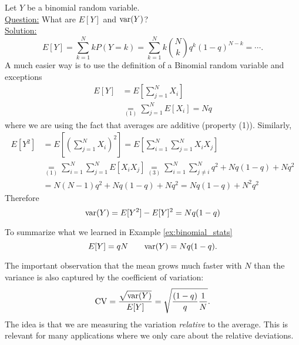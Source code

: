\begin{example}\label{ex:binomial_stats}
Let $Y$ be a binomial random variable. \\
 
 \noindent
\underline{Question:} What are $E[Y]$ and ${\rm var}(Y)$?\\
 
 
  \noindent
\underline{Solution:} 
\begin{equation*}
E[Y] = \sum_{k=1}^N k P(Y=k) =\sum_{k=1}^N k  {N \choose k}q^{k}(1-q)^{N-k} = \cdots. 
\end{equation*}
A much easier way is to use the definition of a Binomial random variable and exceptions 
\begin{align*}
E[Y] &= E\left[\sum_{j=1}^NX_i\right]\\
& \underset{(1)}{=}  \sum_{j=1}^NE\left[X_i\right]  =Nq
\end{align*}
where we are using the fact that averages are additive (property (1)). Similarly, 
\begin{align*}
E[Y^2] &= E\left[\left(\sum_{j=1}^NX_i\right)^2\right] = E\left[\sum_{i=1}^N\sum_{j=1}^NX_iX_j\right] \\
&\underset{(1)}{=}  \sum_{i=1}^N\sum_{j=1}^NE[X_iX_j]\underset{(3)}{=} \sum_{i=1}^N\sum_{j \ne i}^Nq^2 +  Nq(1-q) + Nq^2\\
&= N(N-1)q^2 + Nq(1-q)  +  Nq^2 = Nq(1-q)  + N^2q^2
\end{align*}
Therefore 
\begin{equation*}
{\rm var}(Y) =E[Y^2]-E[Y]^2 =  Nq(1-q)
\end{equation*}
\end{example}
 
To summarize what we learned in Example \ref{ex:binomial_stats}
\begin{equation}\label{eq:binomial_meanvar}
E[Y] = qN \quad\quad{\rm var}(Y) = Nq(1-q). 
\end{equation}


 
 The important observation that the mean grows much faster with $N$ than the variance is also captured by the coefficient of variation: 
\begin{equation*}
{\rm CV} = \frac{\sqrt{{\rm var}(Y)}}{E[Y]} = \sqrt{\frac{(1-q)}{q} \frac{1}{N}}. 
\end{equation*}
The idea is that we are measuring the variation \emph{relative} to the average. This is relevant for many applications where we only care about the relative deviations. 

